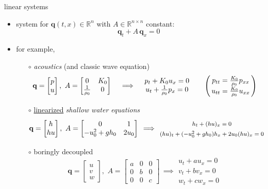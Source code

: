 \documentclass[10pt,hyperref]{beamer}
\newcommand{\bq}{\mathbf{q}}
\newcommand{\RR}{\mathbb{R}}
\begin{document}
\begin{frame}{linear systems}

\begin{itemize}
\item system for $\bq(t,x) \in \RR^n$ with $A\in\RR^{n\times n}$ constant:
  $$\bq_t + A\, \bq_x=0$$
\item for example,
    \begin{itemize}
    \item[$\circ$] \emph{acoustics} (and classic wave equation)
        $$\bq = \begin{bmatrix} p \\ u \end{bmatrix}, \,\, A = \begin{bmatrix} 0 & K_0 \\ \frac{1}{\rho_0} & 0 \end{bmatrix} \quad \implies \quad \begin{matrix} p_t + K_0 u_x = 0 \\ u_t + \frac{1}{\rho_0} p_x = 0 \end{matrix} \qquad \begin{pmatrix} \, {\large \strut} p_{tt} = \frac{K_0}{\rho_0} p_{xx}\, \\ \, {\large \strut} u_{tt} = \frac{K_0}{\rho_0} u_{xx}\, \end{pmatrix}$$
    \item[$\circ$] \underline{linearized} \emph{shallow water equations}
        $$\bq = \begin{bmatrix} h \\ h u \end{bmatrix}, \,\, A = \begin{bmatrix} 0 & 1 \\ -u_0^2+gh_0 & 2 u_0 \end{bmatrix} \, \implies \, {\footnotesize \begin{matrix} {\large \strut} h_t + (hu)_x = 0 \\ {\large \strut} (h u)_t + (-u_0^2+gh_0) h_x + 2u_0 (h u)_x = 0 \end{matrix} }$$
    \item[$\circ$] boringly decoupled
        $$\bq = \begin{bmatrix} u \\ v \\ w \end{bmatrix}, \,\, A = \begin{bmatrix} a & 0 & 0 \\ 0 & b & 0 \\ 0 & 0 & c \end{bmatrix} \, \implies \begin{matrix} u_t + a u_x = 0 \\ v_t + b v_x = 0 \\ w_t + c w_x = 0 \end{matrix}$$
    \end{itemize}
\end{itemize}
\end{frame}
\end{document}
